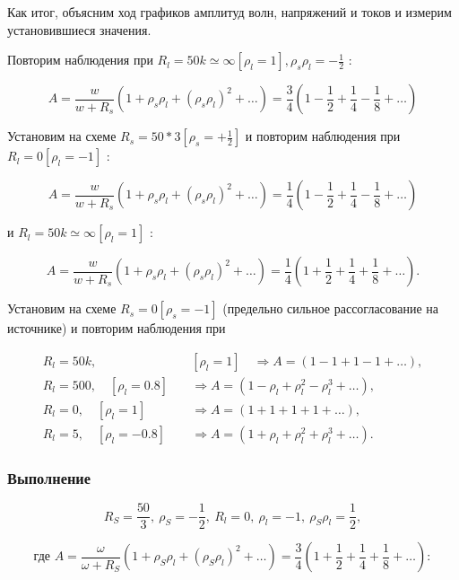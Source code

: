 \documentclass[a4paper, 14pt]{extarticle}%
\begin{document}
Как итог, объясним ход графиков амплитуд волн, напряжений и токов и измерим установившиеся значения.

Повторим наблюдения при $R_{l}=50 k \simeq \infty\left[\rho_{l}=1\right], \rho_{s} \rho_{l}=-\frac{1}{2}$ : 

\[A=\frac{w}{w+R_{s}}\left(1+\rho_{s} \rho_{l}+\left(\rho_{s} \rho_{l}\right)^{2}+\ldots\right)=\frac{3}{4}\left(1-\frac{1}{2}+\frac{1}{4}-\frac{1}{8}+\ldots\right)\]

Установим на схеме $R_{s}=50 * 3\left[\rho_{s}=+\frac{1}{2}\right]$ и повторим наблюдения при $R_{l}=0\left[\rho_{l}=-1\right]$ :

\[A=\frac{w}{w+R_{s}}\left(1+\rho_{s} \rho_{l}+\left(\rho_{s} \rho_{l}\right)^{2}+\ldots\right)=\frac{1}{4}\left(1-\frac{1}{2}+\frac{1}{4}-\frac{1}{8}+\ldots\right)\]

и $R_{l}=50 k \simeq \infty\left[\rho_{l}=1\right]$ :

\[A=\frac{w}{w+R_{s}}\left(1+\rho_{s} \rho_{l}+\left(\rho_{s} \rho_{l}\right)^{2}+\ldots\right)=\frac{1}{4}\left(1+\frac{1}{2}+\frac{1}{4}+\frac{1}{8}+\ldots\right) .\]

Установим на схеме $R_{s}=0\left[\rho_{s}=-1\right]$ (предельно сильное рассогласование на источнике) и повторим наблюдения при

\[
\begin{aligned}
R_{l}=50 k, &\left[\rho_{l}=1\right] \quad \Rightarrow A=(1-1+1-1+\ldots), \\
R_{l}=500, \quad\left[\rho_{l}=0.8\right] \quad & \Rightarrow A=\left(1-\rho_{l}+\rho_{l}^{2}-\rho_{l}^{3}+\ldots\right), \\
R_{l}=0, \quad\left[\rho_{l}=1\right] \quad & \Rightarrow A=(1+1+1+1+\ldots), \\
R_{l}=5, \quad\left[\rho_{l}=-0.8\right] \quad & \Rightarrow A=\left(1+\rho_{l}+\rho_{l}^{2}+\rho_{l}^{3}+\ldots\right).
\end{aligned}
\]

\subsubsection{Выполнение}

\[R_{S}=\frac{50}{3},\ \rho_{S}=-\frac{1}{2},\  R_{l}=0,\ \rho_{l}=-1,\ \rho_{S} \rho_{l}=\frac{1}{2},\]

\[ \text{где }A=\frac{\omega}{\omega+R_{S}}\left(1+\rho_{S} \rho_{l}+\left(\rho_{S} \rho_{l}\right)^{2}+\ldots\right)=\frac{3}{4}\left(1+\frac{1}{2}+\frac{1}{4}+\frac{1}{8}+\ldots\right) :\]
\end{document}
